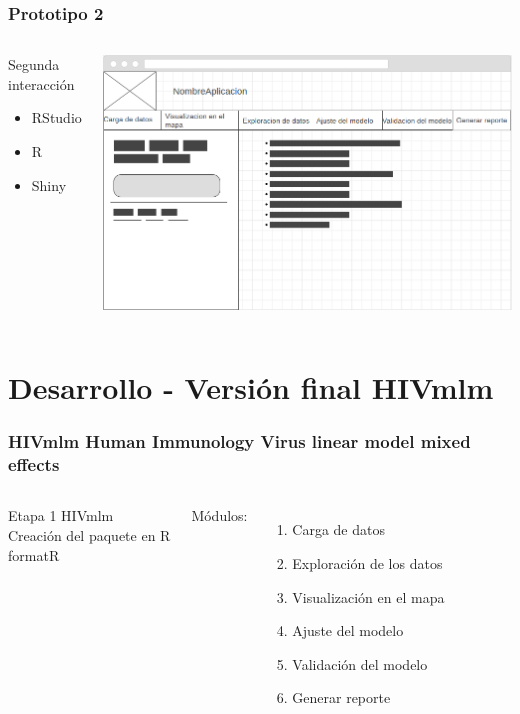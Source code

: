 \documentclass{beamer}%
\begin{document}
\begin{frame}
\frametitle{\textbf{Prototipo 2}}
\begin{columns}[t]
 \begin{block}{ Segunda interacci\'on}
  \begin{itemize}
  	\item RStudio
  	\item R
  	\item Shiny
  \end{itemize}
  	\end{block}
    \begin{center}\includegraphics[height=0.4\textheight]{wireframe.png}\end{center}
  \end{columns}
\end{frame}

\section{Desarrollo - Versi\'on final HIVmlm}

\begin{frame}
\frametitle{\textbf{HIVmlm Human Immunology Virus linear model mixed effects}}
\begin{columns}[t]
 \begin{block}{Etapa 1}
  	HIVmlm \\
  	Creaci\'on del paquete en R \\
  	formatR\\
\end{block}
    M\'odulos:
    \begin{enumerate}
  	\item Carga de datos
  	\item Exploraci\'on de los datos
  	\item Visualizaci\'on en el mapa
  	\item Ajuste del modelo
  	\item Validaci\'on del modelo
  	\item Generar reporte
  \end{enumerate}
  \end{columns}
\end{frame}
\end{document}
